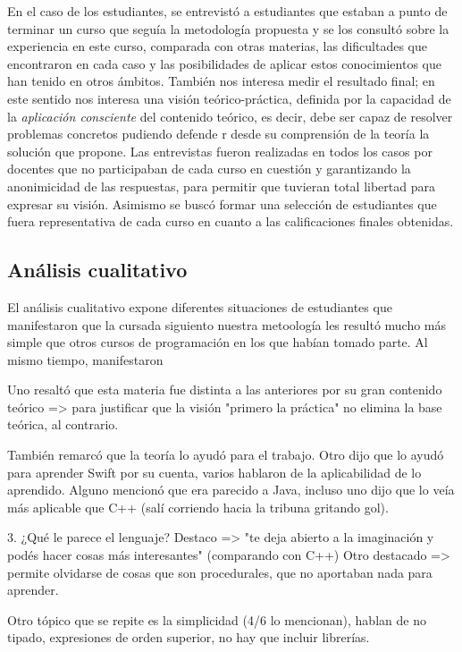 En el caso de los estudiantes, se entrevistó a estudiantes que estaban a punto de terminar un curso que seguía la metodología propuesta y se los consultó sobre la experiencia en este curso, comparada con otras materias, las dificultades que encontraron en cada caso y las posibilidades de aplicar estos conocimientos que han tenido en otros ámbitos. También nos interesa medir el resultado final; en este sentido nos interesa una visión teórico-práctica, definida por la capacidad de la \emph{aplicación consciente} del contenido teórico, es decir, debe ser capaz de resolver problemas concretos pudiendo defende                                          r desde su comprensión de la teoría la solución que propone.
Las entrevistas fueron realizadas en todos los casos por docentes que no participaban de cada curso en cuestión y garantizando la anonimicidad de las respuestas, para permitir que tuvieran total libertad para expresar su visión. Asimismo se buscó formar una selección de estudiantes que fuera representativa de cada curso en cuanto a las calificaciones finales obtenidas.

\subsection*{Análisis cualitativo}

El análisis cualitativo expone diferentes situaciones de estudiantes que manifestaron que la cursada siguiento nuestra metoología les resultó mucho más simple que otros cursos de programación en los que habían tomado parte.
Al mismo tiempo, manifestaron

Uno resaltó que esta materia fue distinta a las anteriores por su gran contenido teórico => para justificar que la visión "primero la práctica" no elimina la base teórica, al contrario.

También remarcó que la teoría lo ayudó para el trabajo. Otro dijo que lo ayudó para aprender Swift por su cuenta, varios hablaron de la aplicabilidad de lo aprendido. Alguno mencionó que era parecido a Java, incluso uno dijo que lo veía más aplicable que C++ (salí corriendo hacia la tribuna gritando gol).

3. ¿Qué le parece el lenguaje?
Destaco => "te deja abierto a la imaginación y podés hacer cosas más interesantes" (comparando con C++)
Otro destacado => permite olvidarse de cosas que son procedurales, que no aportaban nada para aprender. 

Otro tópico que se repite es la simplicidad (4/6 lo mencionan), hablan de no tipado, expresiones de orden superior, no hay que incluir librerías.

